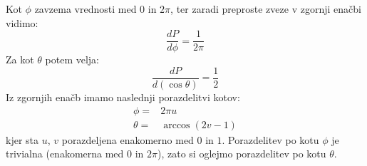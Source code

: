 \documentclass[slovene,11pt,a4paper]{article}
\numberwithin{equation}{section} %
\numberwithin{figure}{section} %
\numberwithin{table}{section} %
\begin{document}
Kot $\phi$ zavzema vrednosti med $0$ in $2 \pi$, ter zaradi preproste zveze v zgornji enačbi vidimo:
\begin{equation}
\frac{dP}{ d\phi} =\frac{1}{2 \pi}
\end{equation}
Za kot $\theta$ potem velja:
\begin{equation}
\frac{dP}{d(\cos\theta)} =\frac{1}{2}
\end{equation}
Iz zgornjih enačb imamo naslednji porazdelitvi kotov:
\begin{equation}
\begin{aligned}
\phi=&2 \pi u \\
\theta =& \arccos(2v-1)
\end{aligned}
\end{equation}
kjer sta $u$, $v$ porazdeljena enakomerno med $0$ in $1$. Porazdelitev po kotu $\phi$ je trivialna (enakomerna med $0$ in $2\pi$), zato si oglejmo porazdelitev po kotu $\theta$.
\end{document}
